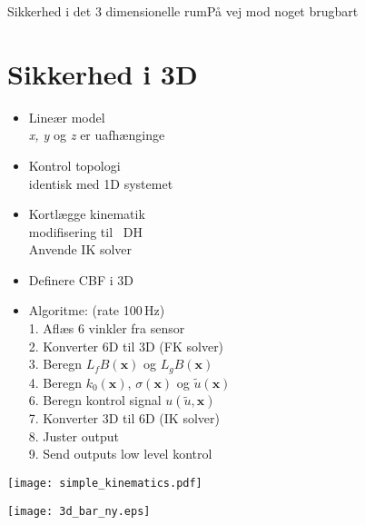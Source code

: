 \begin{frame}{Sikkerhed i det 3 dimensionelle rum}{På vej mod noget brugbart}
\section{Sikkerhed i 3D}
\begin{minipage}{0.45\textwidth}
\vspace*{0.5cm}
\begin{itemize}
	\item Lineær model \\
	\scriptsize  \textit{x, y} og \textit{z} er uafhænginge
	\item \normalsize Kontrol topologi \\
	\scriptsize identisk med 1D systemet
	\item \normalsize Kortlægge kinematik \\
	\scriptsize modifisering til ~DH  \\
	Anvende IK solver
	\item \normalsize Definere CBF i 3D
\end{itemize}
\vspace*{-0.5cm}
\end{minipage}
\begin{minipage}{0.45\textwidth}
\vspace{0.6cm}
\begin{itemize}
	\item Algoritme: (rate 100\,Hz)\vspace{0.1cm}\\
	\scriptsize 1. Aflæs 6 vinkler fra sensor \\
	\scriptsize 2. Konverter 6D til 3D (FK solver) \\
	\scriptsize 3. Beregn $L_fB(\textbf{x})$ og $L_gB(\textbf{x})$ \\
	\scriptsize 4. Beregn $k_0(\textbf{x})$, $\sigma(\textbf{x})$ og $\tilde{u}(\textbf{x})$ \\
	\scriptsize 6. Beregn kontrol signal $u(\tilde{u},\textbf{x})$ \\
	\scriptsize 7. Konverter 3D til 6D (IK solver) \\
	\scriptsize 8. Juster output \\
	\scriptsize 9. Send outputs low level kontrol
\end{itemize}
\end{minipage}
\begin{minipage}{0.45\textwidth}
\texttt{[image: simple\_kinematics.pdf]}
\end{minipage}
\hspace*{0.8cm}
\begin{minipage}{0.45\textwidth}
\texttt{[image: 3d\_bar\_ny.eps]}
\end{minipage}
\end{frame}

